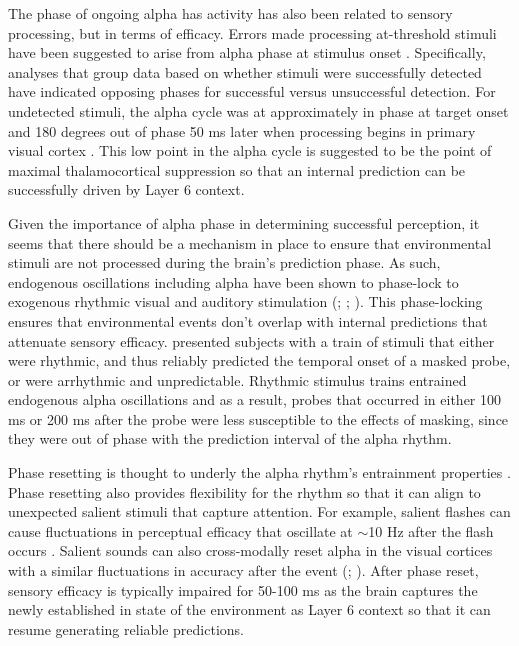 \documentclass[dwyatte_dissertation.tex]{subfiles}
\begin{document}
The phase of ongoing alpha has activity has also been related to sensory processing, but in terms of efficacy. Errors made processing at-threshold stimuli have been suggested to arise from alpha phase at stimulus onset \cite{MathewsonGrattonFabianiEtAl09,BuschDuboisVanRullen09}. Specifically, analyses that group data based on whether stimuli were successfully detected have indicated opposing phases for successful versus unsuccessful detection. For undetected stimuli, the alpha cycle was at approximately in phase at target onset and 180 degrees out of phase 50 ms later when processing begins in primary visual cortex \cite{NowakBullier97,FoxeSimpson02}. This low point in the alpha cycle is suggested to be the point of maximal thalamocortical suppression  so that an internal prediction can be successfully driven by Layer 6 context. 

Given the importance of alpha phase in determining successful perception, it seems that there should be a mechanism in place to ensure that environmental stimuli are not processed during the brain's prediction phase. As such, endogenous oscillations including alpha have been shown to phase-lock to exogenous rhythmic visual and auditory stimulation (; ; ). This phase-locking ensures that environmental events don't overlap with internal predictions that attenuate sensory efficacy.  presented subjects with a train of stimuli that either were rhythmic, and thus reliably predicted the temporal onset of a masked probe, or were arrhythmic and unpredictable. Rhythmic stimulus trains entrained endogenous alpha oscillations and as a result, probes that occurred in either 100 ms or 200 ms after the probe were less susceptible to the effects of masking, since they were out of phase with the prediction interval of the alpha rhythm.

Phase resetting is thought to underly the alpha rhythm's entrainment properties \cite{CalderoneLakatosButlerEtAlInPress}. Phase resetting also provides flexibility for the rhythm  so that it can align to unexpected salient stimuli that capture attention. For example, salient flashes can cause fluctuations in perceptual efficacy that oscillate at $\sim$10 Hz after the flash occurs \cite{LandauFries12}. Salient sounds can also cross-modally reset alpha in the visual cortices with a similar fluctuations in accuracy after the event (; ). After phase reset, sensory efficacy is typically impaired for 50-100 ms as the brain captures the newly established in state of the environment as Layer 6 context so that it can resume generating reliable predictions.
\end{document}

